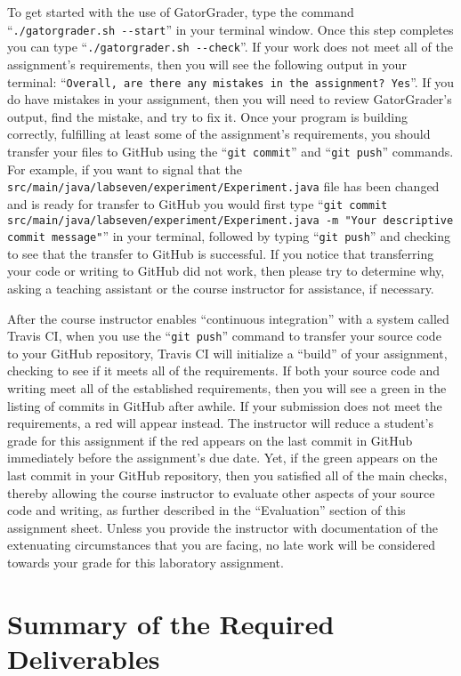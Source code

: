 \documentclass[11pt]{article}
\newcommand{\mainprogramsource}{\lstinline{src/main/java/labseven/experiment/Experiment.java}}
\newcommand{\gatorgraderstart}{\command{./gatorgrader.sh --start}}
\newcommand{\gatorgradercheck}{\command{./gatorgrader.sh --check}}
\newcommand{\gitcommit}{\command{git commit}}
\newcommand{\gitpush}{\command{git push}}
\newcommand{\gitcommitmainprogram}{\command{git commit src/main/java/labseven/experiment/Experiment.java -m "Your
descriptive commit message"}}
\newcommand{\command}[1]{``\lstinline{#1}''}
\newcommand{\step}[1]{``{#1}''}
\newcommand{\checkmark}{\ding{51}}
\newcommand{\naughtmark}{\ding{55}}
\begin{document}
To get started with the use of GatorGrader, type the command \gatorgraderstart{}
in your terminal window. Once this step completes you can type
\gatorgradercheck{}. If your work does not meet all of the assignment's
requirements, then you will see the following output in your terminal:
\command{Overall, are there any mistakes in the assignment? Yes}. If you do have
mistakes in your assignment, then you will need to review GatorGrader's output,
find the mistake, and try to fix it. Once your program is building correctly,
fulfilling at least some of the assignment's requirements, you should transfer
your files to GitHub using the \gitcommit{} and \gitpush{} commands. For
example, if you want to signal that the \mainprogramsource{} file has been
changed and is ready for transfer to GitHub you would first type
\gitcommitmainprogram{} in your terminal, followed by typing \gitpush{} and
checking to see that the transfer to GitHub is successful. If you notice that
transferring your code or writing to GitHub did not work, then please try to
determine why, asking a teaching assistant or the course instructor for
assistance, if necessary.

After the course instructor enables \step{continuous integration} with a system called Travis CI, when you use the
\gitpush{} command to transfer your source code to your GitHub repository, Travis CI will initialize a \step{build} of
your assignment, checking to see if it meets all of the requirements. If both your source code and writing meet all of
the established requirements, then you will see a green \checkmark{} in the listing of commits in GitHub after awhile.
If your submission does not meet the requirements, a red \naughtmark{} will appear instead. The instructor will reduce a
student's grade for this assignment if the red \naughtmark{} appears on the last commit in GitHub immediately before the
assignment's due date. Yet, if the green \checkmark{} appears on the last commit in your GitHub repository, then you
satisfied all of the main checks, thereby allowing the course instructor to evaluate other aspects of your source code
and writing, as further described in the \step{Evaluation} section of this assignment sheet. Unless you provide the
instructor with documentation of the extenuating circumstances that you are facing, no late work will be considered
towards your grade for this laboratory assignment.

\section*{Summary of the Required Deliverables}
\end{document}
